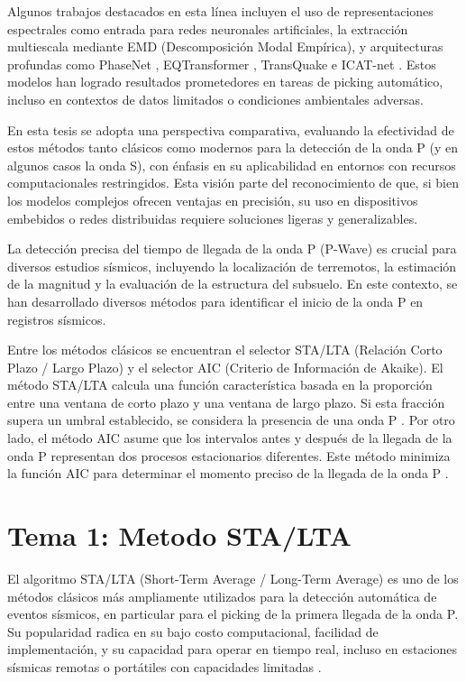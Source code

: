 Algunos trabajos destacados en esta línea incluyen el uso de representaciones espectrales como entrada para redes neuronales artificiales, la extracción multiescala mediante EMD (Descomposición Modal Empírica), y arquitecturas profundas como PhaseNet \cite{10.1093/gji/ggy423}, EQTransformer \cite{mousavi2019cred}, TransQuake \cite{zhang2023ept} e ICAT-net \cite{Bertino93}. Estos modelos han logrado resultados prometedores en tareas de picking automático, incluso en contextos de datos limitados o condiciones ambientales adversas.

En esta tesis se adopta una perspectiva comparativa, evaluando la efectividad de estos métodos tanto clásicos como modernos para la detección de la onda P (y en algunos casos la onda S), con énfasis en su aplicabilidad en entornos con recursos computacionales restringidos. Esta visión parte del reconocimiento de que, si bien los modelos complejos ofrecen ventajas en precisión, su uso en dispositivos embebidos o redes distribuidas requiere soluciones ligeras y generalizables.

La detección precisa del tiempo de llegada de la onda P (P-Wave) es crucial para diversos estudios sísmicos, incluyendo la localización de terremotos, la estimación de la magnitud y la evaluación de la estructura del subsuelo. En este contexto, se han desarrollado diversos métodos para identificar el inicio de la onda P en registros sísmicos.

Entre los métodos clásicos se encuentran el selector STA/LTA (Relación Corto Plazo / Largo Plazo) y el selector AIC (Criterio de Información de Akaike). El método STA/LTA calcula una función característica basada en la proporción entre una ventana de corto plazo y una ventana de largo plazo. Si esta fracción supera un umbral establecido, se considera la presencia de una onda P \cite{zhang2020first} \cite{kalkan2016automatic}. Por otro lado, el método AIC asume que los intervalos antes y después de la llegada de la onda P representan dos procesos estacionarios diferentes. Este método minimiza la función AIC para determinar el momento preciso de la llegada de la onda P \cite{shang2018enhancing}.

\section{Tema 1: Metodo STA/LTA}

El algoritmo STA/LTA (Short-Term Average / Long-Term Average) es uno de los métodos clásicos más ampliamente utilizados para la detección automática de eventos sísmicos, en particular para el picking de la primera llegada de la onda P. Su popularidad radica en su bajo costo computacional, facilidad de implementación, y su capacidad para operar en tiempo real, incluso en estaciones sísmicas remotas o portátiles con capacidades limitadas \cite{allen1978automatic}.


